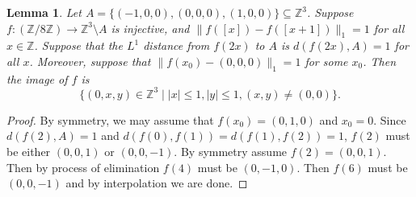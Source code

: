 \documentclass{article}
\newtheorem{lemma}[theorem]{Lemma}
\begin{document}
\begin{lemma}\label{urgentcare-sep8}
	Let $A = \{(-1,0,0), (0,0,0), (1,0,0)\} \subseteq \mathbb Z^3$.
	Suppose $f: (\mathbb Z / 8\mathbb Z) \to \mathbb Z^3 \setminus A$ is injective, and
	$\|f([x])-f([x+1])\|_1=1$ for all $x\in\mathbb Z$.
	Suppose that the $L^1$ distance from $f(2x)$ to $A$ is $d(f(2x),A)=1$ for all $x$.
	Moreover, suppose that $\|f(x_0) - (0,0,0)\|_1=1$ for some $x_0$.
	Then the image of $f$ is
	\[
		\{(0,x,y)\in\mathbb Z^3 \mid |x|\le 1, |y|\le 1, (x,y)\ne (0,0)\}.
	\]
\end{lemma}
\begin{proof}
	By symmetry, we may assume that $f(x_0) = (0,1,0)$ and $x_0=0$. Since $d(f(2),A)=1$ and $d(f(0),f(1))=d(f(1),f(2))=1$,
	$f(2)$ must be either $(0,0,1)$ or $(0,0,-1)$. By symmetry assume $f(2) = (0,0,1)$.
	Then by process of elimination $f(4)$ must be $(0,-1,0)$.
	Then $f(6)$ must be $(0,0,-1)$ and by interpolation we are done.
\end{proof}
\end{document}
